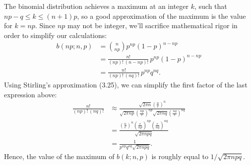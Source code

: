 The binomial distribution achieves a maximum at an integer $k$, such that $np-q\le k\le(n+1)p$, so a good approximation of the maximum is the value for $k=np$.
Since $np$ may not be integer, we'll sacrifice mathematical rigor in order to simplify our calculations:
\begin{align*}
    b(np;n,p) &= \binom{n}{np}p^{np}(1-p)^{n-np} \\
    &= \frac{n!}{(np)!\,(n-np)!}\,p^{np}(1-p)^{n-np} \\[1mm]
    &= \frac{n!}{(np)!\,(nq)!}\,p^{np}q^{nq}.
\end{align*}
Using Stirling's approximation (3.25), we can simplify the first factor of the last expression above:
\begin{align*}
    \frac{n!}{(np)!\,(nq)!} &\approx \frac{\!\sqrt{2\pi n}\left(\frac{n}{e}\right)^n}{\!\sqrt{2\pi np}\left(\frac{np}{e}\right)^{np}\!\sqrt{2\pi nq}\left(\frac{nq}{e}\right)^{nq}} \\[1mm]
    &= \frac{\left(\frac{n}{e}\right)^n\left(\frac{e}{np}\right)^{np}\left(\frac{e}{nq}\right)^{nq}}{\!\sqrt{2\pi npq}} \\[1mm]
    &= \frac{1}{p^{np}q^{nq}\!\sqrt{2\pi npq}}.
\end{align*}
Hence, the value of the maximum of $b(k;n,p)$ is roughly equal to $1/\!\sqrt{2\pi npq}$.
